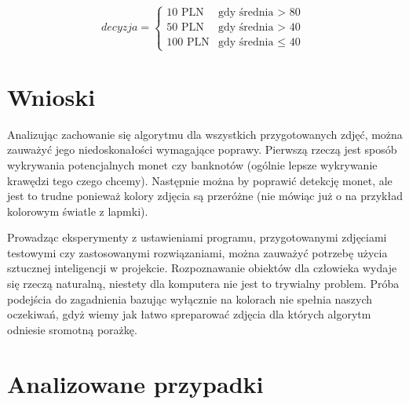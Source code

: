 \documentclass{mwart}
\begin{document}
$$
decyzja = \left\{\begin{array}{ll}
\textrm{10 PLN} & \textrm{gdy średnia $>$ 80}\\
\textrm{50 PLN} & \textrm{gdy średnia $>$ 40}\\
\textrm{100 PLN} & \textrm{gdy średnia $\leq$ 40 }
\end{array} \right.
$$

\section{Wnioski}
Analizując zachowanie się algorytmu dla wszystkich przygotowanych zdjęć, można zauważyć jego niedoskonałości wymagające poprawy. Pierwszą rzeczą jest sposób wykrywania potencjalnych monet czy banknotów (ogólnie lepsze wykrywanie krawędzi tego czego chcemy).
Następnie można by poprawić detekcję monet, ale jest to trudne ponieważ kolory zdjęcia są przeróżne (nie mówiąc już o na przykład kolorowym światle z lapmki).

Prowadząc eksperymenty z ustawieniami programu, przygotowanymi zdjęciami testowymi czy zastosowanymi rozwiązaniami, można zauważyć potrzebę użycia sztucznej inteligencji w projekcie.
Rozpoznawanie obiektów dla człowieka wydaje się rzeczą naturalną, niestety dla komputera nie jest to trywialny problem. Próba podejścia do zagadnienia bazując wyłącznie na kolorach nie spełnia naszych oczekiwań, gdyż wiemy jak łatwo spreparować zdjęcia dla których algorytm odniesie sromotną porażkę.

\section{Analizowane przypadki}
\end{document}

